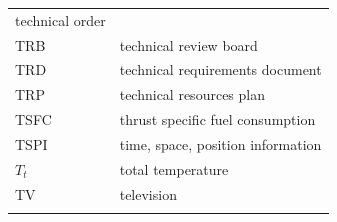 \documentclass[
]{book}
\begin{document}
\begin{longtable}[]{@{}ll@{}}
\begin{minipage}[t]{0.47\columnwidth}
technical order\strut
\end{minipage}\tabularnewline
\begin{minipage}[t]{0.47\columnwidth}\raggedright
TRB\strut
\end{minipage} & \begin{minipage}[t]{0.47\columnwidth}\raggedright
technical review board\strut
\end{minipage}\tabularnewline
\begin{minipage}[t]{0.47\columnwidth}\raggedright
TRD\strut
\end{minipage} & \begin{minipage}[t]{0.47\columnwidth}\raggedright
technical requirements document\strut
\end{minipage}\tabularnewline
\begin{minipage}[t]{0.47\columnwidth}\raggedright
TRP\strut
\end{minipage} & \begin{minipage}[t]{0.47\columnwidth}\raggedright
technical resources plan\strut
\end{minipage}\tabularnewline
\begin{minipage}[t]{0.47\columnwidth}\raggedright
TSFC\strut
\end{minipage} & \begin{minipage}[t]{0.47\columnwidth}\raggedright
thrust specific fuel consumption\strut
\end{minipage}\tabularnewline
\begin{minipage}[t]{0.47\columnwidth}\raggedright
TSPI\strut
\end{minipage} & \begin{minipage}[t]{0.47\columnwidth}\raggedright
time, space, position information\strut
\end{minipage}\tabularnewline
\begin{minipage}[t]{0.47\columnwidth}\raggedright
\(T_t\)\strut
\end{minipage} & \begin{minipage}[t]{0.47\columnwidth}\raggedright
total temperature\strut
\end{minipage}\tabularnewline
\begin{minipage}[t]{0.47\columnwidth}\raggedright
TV\strut
\end{minipage} & \begin{minipage}[t]{0.47\columnwidth}\raggedright
television\strut
\end{minipage}\tabularnewline
\begin{minipage}[t]{0.47\columnwidth}\raggedright

\end{minipage}
\end{longtable}
\end{document}
